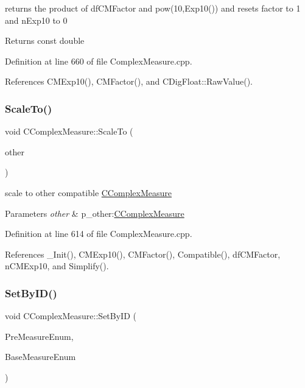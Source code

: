 returns the product of df\+C\+M\+Factor and pow(10,\+Exp10()) and resets factor to 1 and n\+Exp10 to 0 

\begin{DoxyReturn}{Returns}
const double 
\end{DoxyReturn}


Definition at line 660 of file Complex\+Measure.\+cpp.



References C\+M\+Exp10(), C\+M\+Factor(), and C\+Dig\+Float\+::\+Raw\+Value().

\mbox{\label{classCComplexMeasure_a999dd5e5bb71a6bc548f959879b4e12f}} 
\subsubsection{\texorpdfstring{Scale\+To()}{ScaleTo()}}
{\footnotesize\ttfamily void C\+Complex\+Measure\+::\+Scale\+To (\begin{DoxyParamCaption}\item[{const \hyperlink{classCComplexMeasure}{C\+Complex\+Measure} \&}]{other }\end{DoxyParamCaption})}



scale to other compatible \hyperlink{classCComplexMeasure}{C\+Complex\+Measure} 


\begin{DoxyParams}{Parameters}
{\em other} & p\+\_\+other\+:\hyperlink{classCComplexMeasure}{C\+Complex\+Measure} \\
\hline
\end{DoxyParams}


Definition at line 614 of file Complex\+Measure.\+cpp.



References \+\_\+\+Init(), C\+M\+Exp10(), C\+M\+Factor(), Compatible(), df\+C\+M\+Factor, n\+C\+M\+Exp10, and Simplify().

\mbox{\label{classCComplexMeasure_a47dca89bc28bbb257f81df4d363be623}} 
\subsubsection{\texorpdfstring{Set\+By\+I\+D()}{SetByID()}}
{\footnotesize\ttfamily void C\+Complex\+Measure\+::\+Set\+By\+ID (\begin{DoxyParamCaption}\item[{const \hyperlink{PreMeasure_8h_a6c81167b8d4c2badde42f81cb7214620}{e\+Pre\+Measure}}]{Pre\+Measure\+Enum,  }\item[{const \hyperlink{BaseMeasure_8h_ac90e5164ccf1f0d648fba7e94b229a11}{e\+Base\+Measure}}]{Base\+Measure\+Enum }\end{DoxyParamCaption})}



